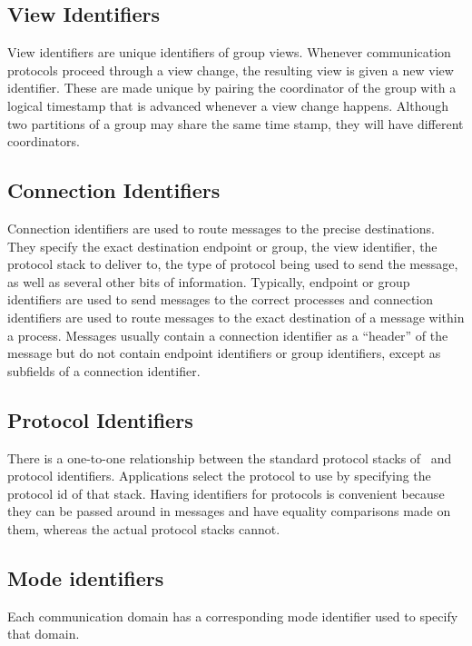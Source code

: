 \subsection{View Identifiers}
View identifiers are unique identifiers of group views.  Whenever communication
protocols proceed through a view change, the resulting view is given a new view
identifier.  These are made unique by pairing the coordinator of the group with a
logical timestamp that is advanced whenever a view change happens.  Although two
partitions of a group may share the same time stamp, they will have different
coordinators.

\subsection{Connection Identifiers}
Connection identifiers are used to route messages to the precise destinations.  They
specify the exact destination endpoint or group, the view identifier, the protocol
stack to deliver to, the type of protocol being used to send the message, as well as
several other bits of information.  Typically, endpoint or group identifiers are used
to send messages to the correct processes and connection identifiers are used to
route messages to the exact destination of a message within a process.  Messages
usually contain a connection identifier as a ``header'' of the message but do not
contain endpoint identifiers or group identifiers, except as subfields of a
connection identifier.

\subsection{Protocol Identifiers}
There is a one-to-one relationship between the standard protocol stacks of \ensemble\
and protocol identifiers.  Applications select the protocol to use by specifying the
protocol id of that stack.  Having identifiers for protocols is convenient because
they can be passed around in messages and have equality comparisons made on them,
whereas the actual protocol stacks cannot.

\subsection{Mode identifiers}  
Each communication domain has a corresponding mode identifier used to specify that
domain.

